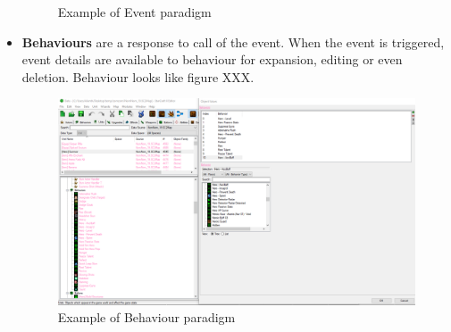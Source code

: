 \documentclass{article}
\begin{document}
\begin{itemize}
\begin{figure}[H]
        \caption{Example of Event paradigm}
        \label{fig:bodevt}
    \end{figure}
    \item \textbf{Behaviours} are a response to call of the event. When the event is triggered, event details are available to behaviour for expansion, editing or even deletion. Behaviour looks like figure XXX.
    \begin{figure}[H]
        \centering
        \includegraphics[width=1\textwidth]{galaxy_behaviours.PNG}
        \caption{Example of Behaviour paradigm}
        \label{fig:bodbeh}
    \end{figure}
\end{itemize}
\end{document}
